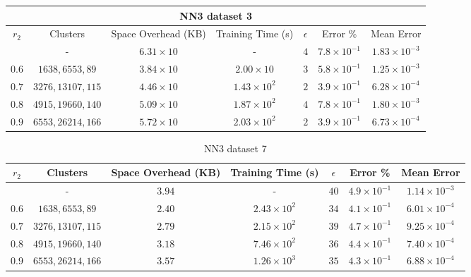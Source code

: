 \begin{adjustwidth}{-1.5cm}{}
\begin{table}
\begin{tabular}{ccccccc}
\hline
\multicolumn{7}{c}{NN3 dataset 3} \\
\toprule
$r_2$ & Clusters & Space Overhead (KB) & Training Time (s) & $\epsilon$ & Error \% & Mean Error\\
\midrule
 & - & $6.31 \times 10$ & - & $4$ & $7.8 \times 10^{-1}$ & $1.83 \times 10^{-3}$\\
$0.6$ & $1638, 6553, 89$ & $3.84 \times 10$ & $2.00 \times 10$ & $3$ & $5.8 \times 10^{-1}$ & $1.25 \times 10^{-3}$\\
$0.7$ & $3276, 13107, 115$ & $4.46 \times 10$ & $1.43 \times 10^2$ & $2$ & $3.9 \times 10^{-1}$ & $6.28 \times 10^{-4}$\\
$0.8$ & $4915, 19660, 140$ & $5.09 \times 10$ & $1.87 \times 10^2$ & $4$ & $7.8 \times 10^{-1}$ & $1.80 \times 10^{-3}$\\
$0.9$ & $6553, 26214, 166$ & $5.72 \times 10$ & $2.03 \times 10^2$ & $2$ & $3.9 \times 10^{-1}$ & $6.73 \times 10^{-4}$\\
\bottomrule
\end{tabular}
\end{table}
\end{adjustwidth}

\begin{adjustwidth}{-1.5cm}{}
\begin{table}
\caption{NN3 dataset 7}\label{ws37}
\begin{tabular}{ccccccc}
\hline
\toprule
$r_2$ & Clusters & Space Overhead (KB) & Training Time (s) & $\epsilon$ & Error \% & Mean Error\\
\midrule
& - & $3.94$ & - & $40$ & $4.9 \times 10^{-1}$ & $1.14 \times 10^{-3}$\\
$0.6$ & $1638, 6553, 89$ & $2.40$ & $2.43 \times 10^2$ & $34$ & $4.1 \times 10^{-1}$ & $6.01 \times 10^{-4}$\\
$0.7$ & $3276, 13107, 115$ & $2.79$ & $2.15 \times 10^2$ & $39$ & $4.7 \times 10^{-1}$ & $9.25 \times 10^{-4}$\\
$0.8$ & $4915, 19660, 140$ & $3.18$ & $7.46 \times 10^2$ & $36$ & $4.4 \times 10^{-1}$ & $7.40 \times 10^{-4}$\\
$0.9$ & $6553, 26214, 166$ & $3.57$ & $1.26 \times 10^3$ & $35$ & $4.3 \times 10^{-1}$ & $6.88 \times 10^{-4}$\\
\bottomrule
\end{tabular}
\end{table}
\end{adjustwidth}

